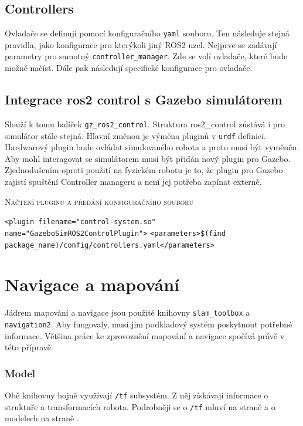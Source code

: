 \subsection*{Controllers}
Ovladače se definují pomocí konfiguračního \verb|yaml| souboru. Ten následuje stejná pravidla, jako konfigurace pro kterýkoli jiný ROS2 uzel. Nejprve se zadávají parametry pro samotný \verb|controller_manager|. Zde se volí ovladače, které bude možné načíst. Dále pak následují specifické konfigurace pro ovladače. \cite{ros2_control_documentation}

\subsection*{Integrace ros2 control s Gazebo simulátorem}
Slouží k tomu balíček \verb|gz_ros2_control|. Struktura ros2\_control zůstává i pro simulátor stále stejná. Hlavní změnou je výměna pluginů v \verb|urdf| definici. Hardwarový plugin bude ovládat simulovaného robota a proto musí být vyměněn. Aby mohl interagovat se simulátorem musí být přidán nový plugin pro Gazebo. Zjednodušením oproti použití na fyzickém robotu je to, že plugin pro Gazebo zajistí spuštění Controller manageru a není jej potřeba zapínat externě.

\begin{algorithm}[h!]
	\label{}
	\caption{\textsc{Načtení pluginu a předání konfiguračního souboru}}
	
	\DontPrintSemicolon
	\SetAlgoNoLine
	\SetNlSty{}{}{:}
	\SetNlSkip{-1.1em}
	
	\BlankLine \Indp\Indpp
	
	\texttt{<plugin filename="control-system.so" name="GazeboSimROS2ControlPlugin">}\;
	\Indp
	\texttt{<parameters>\$(find package\_name)/config/controllers.yaml</parameters>}\;
	
\end{algorithm}

\section{Navigace a mapování}
Jádrem mapování a navigace jsou použité knihovny \verb|slam_toolbox| a \verb|navigation2|. Aby fungovaly, musí jim podkladový systém poskytnout potřebné informace. Většina práce ke zprovoznění mapování a navigace spočívá právě v této přípravě.

\subsubsection*{Model}
Obě knihovny hojně využívají \verb|/tf| subsystém. Z něj získávají informace o struktuře a transformacích robota. Podrobněji se o \verb|/tf| mluví na straně \pageref{theory:tf} a o modelech na straně \pageref{implementation:model}.

